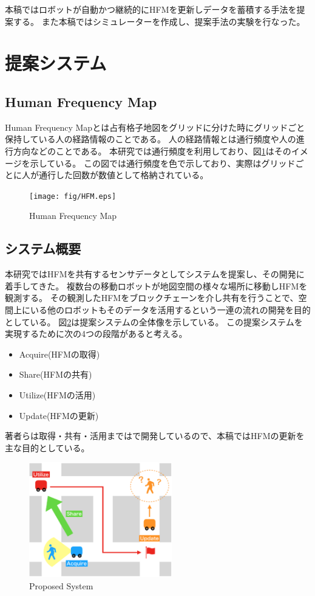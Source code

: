 \documentclass{jsarticle}
\begin{document}
本稿ではロボットが自動かつ継続的にHFMを更新しデータを蓄積する手法を提案する。
また本稿ではシミュレーターを作成し、提案手法の実験を行なった。


\section{提案システム}
\subsection{Human Frequency Map}
Human Frequency Mapとは占有格子地図をグリッドに分けた時にグリッドごと保持している人の経路情報のことである。
人の経路情報とは通行頻度や人の進行方向などのことである。
本研究では通行頻度を利用しており、図\ref{fig: HFM}はそのイメージを示している。
この図では通行頻度を色で示しており、実際はグリッドごとに人が通行した回数が数値として格納されている。
\begin{figure}[tbh]
 \centering
  \texttt{[image: fig/HFM.eps]}
  \vspace*{-4mm}
  \caption{Human Frequency Map}
  \label{fig: HFM}
\end{figure}

\subsection{システム概要}
本研究ではHFMを共有するセンサデータとしてシステムを提案し、その開発に着手してきた。
複数台の移動ロボットが地図空間の様々な場所に移動しHFMを観測する。
その観測したHFMをブロックチェーンを介し共有を行うことで、空間上にいる他のロボットもそのデータを活用するという一連の流れの開発を目的としている。
図\ref{fig: proposedsystem}は提案システムの全体像を示している。
この提案システムを実現するために次の4つの段階があると考える。
\begin{itemize}
  \item Acquire(HFMの取得)
  \item Share(HFMの共有)
  \item Utilize(HFMの活用)
  \item Update(HFMの更新)
\end{itemize}
著者らは取得・共有・活用までは\cite{4}で開発しているので、本稿ではHFMの更新を主な目的としている。


\begin{figure}[tbh]
 \centering
  \includegraphics[height=50mm]{fig/proposedsystem.eps}
  \vspace*{-4mm}
  \caption{Proposed System}
  \label{fig: proposedsystem}
\end{figure}
\end{document}
